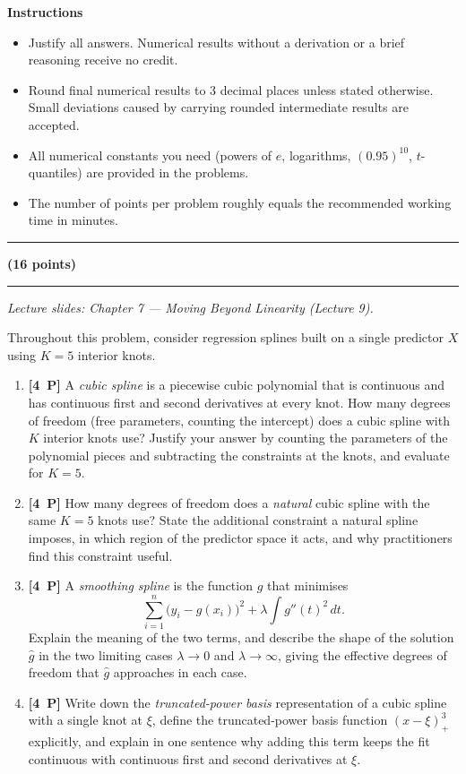 \documentclass[11pt,a4paper]{article}
\newcommand{\problem}[2]{\par\vspace{7mm}\noindent{\large\textbf{Problem #1}}%
  \hfill{\large\textbf{(#2 points)}}\par\nopagebreak\vspace{0.6mm}%
  \noindent\rule{\textwidth}{0.6pt}\par\nopagebreak\vspace{2.5mm}}
\newcommand{\pp}[1]{\textbf{[#1~P]}\enspace}
\begin{document}
\vspace{2.5mm}
\textbf{Instructions}
\begin{itemize}[nosep,leftmargin=5.5mm]
  \item Justify all answers. Numerical results without a derivation or a brief reasoning receive no credit.
  \item Round final numerical results to 3 decimal places unless stated otherwise. Small deviations caused by carrying rounded intermediate results are accepted.
  \item All numerical constants you need (powers of $e$, logarithms, $(0.95)^{10}$, $t$-quantiles) are provided in the problems.
  \item The number of points per problem roughly equals the recommended working time in minutes.
\end{itemize}
\vspace{1mm}\noindent\rule{\textwidth}{0.6pt}

\problem{1: Moving beyond linearity --- splines}{16}
{\small\itshape Lecture slides: Chapter 7 --- Moving Beyond Linearity (Lecture 9).}\par\vspace{1mm}

Throughout this problem, consider regression splines built on a single predictor $X$ using
$K=5$ interior knots.

\begin{enumerate}[label=(\alph*),leftmargin=7mm,itemsep=2.5mm]
  \item \pp{4} A \emph{cubic spline} is a piecewise cubic polynomial that is continuous and has
    continuous first and second derivatives at every knot. How many degrees of freedom
    (free parameters, counting the intercept) does a cubic spline with $K$ interior knots use?
    Justify your answer by counting the parameters of the polynomial pieces and subtracting the
    constraints at the knots, and evaluate for $K=5$.
  \item \pp{4} How many degrees of freedom does a \emph{natural} cubic spline with the same
    $K=5$ knots use? State the additional constraint a natural spline imposes, in which region
    of the predictor space it acts, and why practitioners find this constraint useful.
  \item \pp{4} A \emph{smoothing spline} is the function $g$ that minimises
    \[
      \sum_{i=1}^{n}\bigl(y_i-g(x_i)\bigr)^2+\lambda\int g''(t)^2\,dt .
    \]
    Explain the meaning of the two terms, and describe the shape of the solution $\hat{g}$ in
    the two limiting cases $\lambda\to 0$ and $\lambda\to\infty$, giving the effective degrees
    of freedom that $\hat{g}$ approaches in each case.
  \item \pp{4} Write down the \emph{truncated-power basis} representation of a cubic spline with
    a single knot at $\xi$, define the truncated-power basis function $(x-\xi)^3_+$ explicitly,
    and explain in one sentence why adding this term keeps the fit continuous with continuous
    first and second derivatives at $\xi$.
\end{enumerate}
\end{document}
